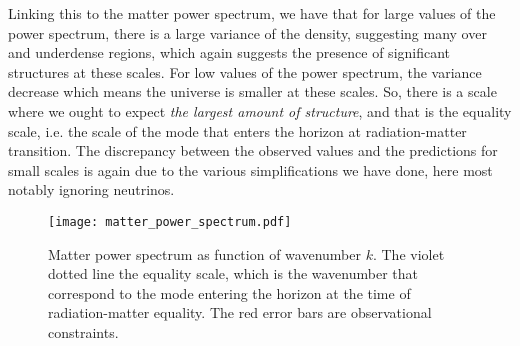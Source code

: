         Linking this to the matter power spectrum, we have that for large values of the power spectrum, there is a large variance of the density, suggesting many over and underdense regions, which again suggests the presence of significant structures at these scales. For low values of the power spectrum, the variance decrease which means the universe is smaller at these scales. So, there is a scale where we ought to expect \textit{the largest amount of structure}, and that is the equality scale, i.e. the scale of the mode that enters the horizon at radiation-matter transition. The discrepancy between the observed values and the predictions for small scales is again due to the various simplifications we have done, here most notably ignoring neutrinos.
    \begin{figure}
        \texttt{[image: matter\_power\_spectrum.pdf]}
        \caption{Matter power spectrum as function of wavenumber $k$. The violet dotted line the equality scale, which is the wavenumber that correspond to the mode entering the horizon at the time of radiation-matter equality. The red error bars are observational constraints.}
        \label{fig:m4:matter_power_spectrum}
    \end{figure}